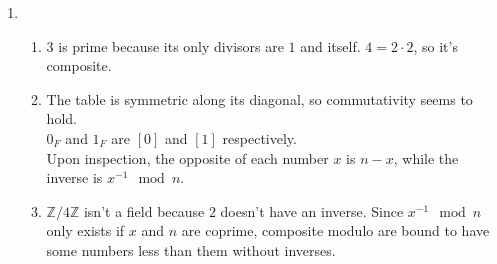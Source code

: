 \documentclass[12pt]{article}
\begin{document}
\begin{enumerate}
\begin{enumerate}
                  \pagebreak

                  \item \begin{enumerate}
                            \item $3$ is prime because its only divisors are $1$ and itself.
                            $4=2 \cdot 2$, so it's composite.
                            \item The table is symmetric along its diagonal, so commutativity seems to hold. \\
                            $0_F$ and $1_F$ are $[0]$ and $[1]$ respectively. \\
                            Upon inspection, the opposite of each number $x$ is $n-x$, while the inverse is $x^{-1} \mod n$.
                            \item $\mathbb{Z}/4\mathbb{Z}$ isn't a field because $2$ doesn't have an inverse.
                            Since $x^{-1} \mod n$ only exists if $x$ and $n$ are coprime, composite modulo are bound to have some numbers less than them without inverses.
                  \end{enumerate}
        \end{enumerate}
    \end{enumerate}
\end{document}
